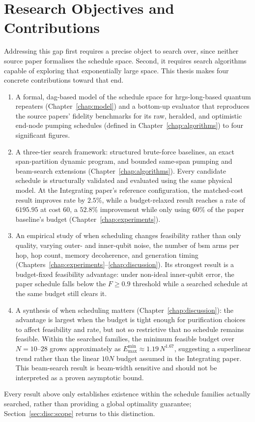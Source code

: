 \section{Research Objectives and Contributions}
\label{sec:intro:contributions}

Addressing this gap first requires a precise object to search over, since neither source paper formalises the schedule space. Second, it requires search algorithms capable of exploring that exponentially large space. This thesis makes four concrete contributions toward that end.

\begin{enumerate}
    \item A formal, \Gls{dag}-based model of the schedule space for \Gls{hrgs-long}-based quantum repeaters (Chapter~\ref{chap:model}) and a bottom-up evaluator that reproduces the source papers' fidelity benchmarks for its raw, heralded, and optimistic end-node pumping schedules (defined in Chapter~\ref{chap:algorithms}) to four significant figures.

    \item A three-tier search framework: structured brute-force baselines, an exact span-partition dynamic program, and bounded same-span pumping and beam-search extensions (Chapter~\ref{chap:algorithms}). Every candidate schedule is structurally validated and evaluated using the same physical model. At the Integrating paper's reference configuration, the matched-cost result improves rate by $2.5\%$, while a budget-relaxed result reaches a rate of $6195.95$ at cost $60$, a $52.8\%$ improvement while only using $60\%$ of the paper baseline's budget (Chapter~\ref{chap:experiments}).

    \item An empirical study of when scheduling changes feasibility rather than only quality, varying outer- and inner-qubit noise, the number of \Gls{bsm} arms per hop, hop count, memory decoherence, and generation timing (Chapters~\ref{chap:experiments}--\ref{chap:discussion}). Its strongest result is a budget-fixed feasibility advantage: under non-ideal inner-qubit error, the paper schedule falls below the $F \ge 0.9$ threshold while a searched schedule at the same budget still clears it.

    \item A synthesis of when scheduling matters (Chapter~\ref{chap:discussion}): the advantage is largest when the budget is tight enough for purification choices to affect feasibility and rate, but not so restrictive that no schedule remains feasible. Within the searched families, the minimum feasible budget over $N=10$--$28$ grows approximately as $E_{\max}^{\min} \approx 1.19\,N^{1.67}$, suggesting a superlinear trend rather than the linear $10N$ budget assumed in the Integrating paper. This beam-search result is beam-width sensitive and should not be interpreted as a proven asymptotic bound.

\end{enumerate}

\noindent Every result above only establishes existence within the schedule families actually searched, rather than providing a global optimality guarantee; Section~\ref{sec:disc:scope} returns to this distinction.